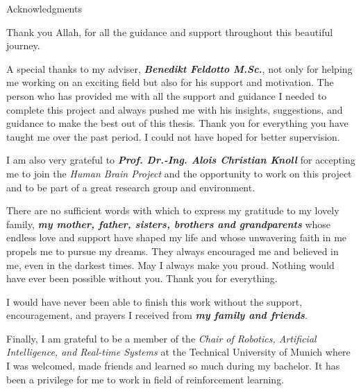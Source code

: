 \thispagestyle{empty}

\vspace*{10mm}

\begin{center}
{ Acknowledgments}
\end{center}

\vspace{5mm}

\begin{center}
Thank you Allah, for all the guidance and support throughout this beautiful journey.
\end{center} 


A special thanks to my adviser, \textit{\textbf{Benedikt Feldotto M.Sc.}}, not only for helping me working on an exciting field but also for his support and motivation. The person who has provided me with all the support and guidance I needed to complete this project and always pushed me with his insights, suggestions, and guidance to make the best out of this thesis. Thank you for everything you have taught me over the past period. I could not have hoped for better supervision.

I am also very grateful to \textit{\textbf{Prof. Dr.-Ing. Alois Christian Knoll}} for accepting me to join the \textit{Human Brain Project} and the opportunity to work on this project and to be part of a great research group and environment.

There are no sufficient words with which to express my gratitude to my lovely family, \textit{\textbf{my mother, father, sisters, brothers and grandparents}} whose endless love and support have shaped my life and whose unwavering faith in me propels me to pursue my dreams. They always encouraged me and believed in me, even in the darkest times. May I always make you proud. Nothing would have ever been possible without you. Thank you for everything.

I would have never been able to finish this work without the support, encouragement, and prayers I received from \textit{\textbf{my family and friends}}.

Finally, I am grateful to be a member of the \textit{Chair of Robotics, Artificial Intelligence, and Real-time Systems} at the Technical University of Munich where I was welcomed, made friends and learned so much during my bachelor. It has been a privilege for me to work in field of reinforcement learning.
